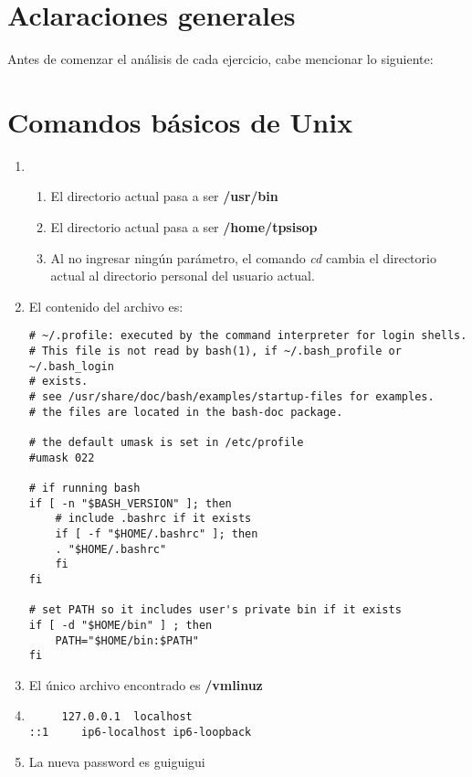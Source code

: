 \documentclass[a4paper,11pt] {article}
\begin{document}

\maketitle

\bigskip
\section*{Aclaraciones generales}

Antes de comenzar el an\'alisis de cada ejercicio, cabe mencionar lo siguiente: 

\section{Comandos básicos de Unix}

\begin{enumerate}
	\item \begin{enumerate}
		\item El directorio actual pasa a ser \textbf{/usr/bin}
		\item El directorio actual pasa a ser \textbf{/home/tpsisop}
		\item Al no ingresar ningún parámetro, el comando \textit{cd} cambia el directorio actual al directorio personal del usuario actual.
	\end{enumerate}
	\item El contenido del archivo es:
	\begin{verbatim}
# ~/.profile: executed by the command interpreter for login shells.
# This file is not read by bash(1), if ~/.bash_profile or ~/.bash_login
# exists.
# see /usr/share/doc/bash/examples/startup-files for examples.
# the files are located in the bash-doc package.

# the default umask is set in /etc/profile
#umask 022

# if running bash
if [ -n "$BASH_VERSION" ]; then
    # include .bashrc if it exists
    if [ -f "$HOME/.bashrc" ]; then
	. "$HOME/.bashrc"
    fi
fi

# set PATH so it includes user's private bin if it exists
if [ -d "$HOME/bin" ] ; then
    PATH="$HOME/bin:$PATH"
fi
	\end{verbatim}
	\item El único archivo encontrado es \textbf{/vmlinuz}
	\setcounter{enumi}{8}
	\item 
	\begin{verbatim}
	 127.0.0.1	localhost
::1     ip6-localhost ip6-loopback
	\end{verbatim}
	\item La nueva password es guiguigui
\end{enumerate}
\end{document}
